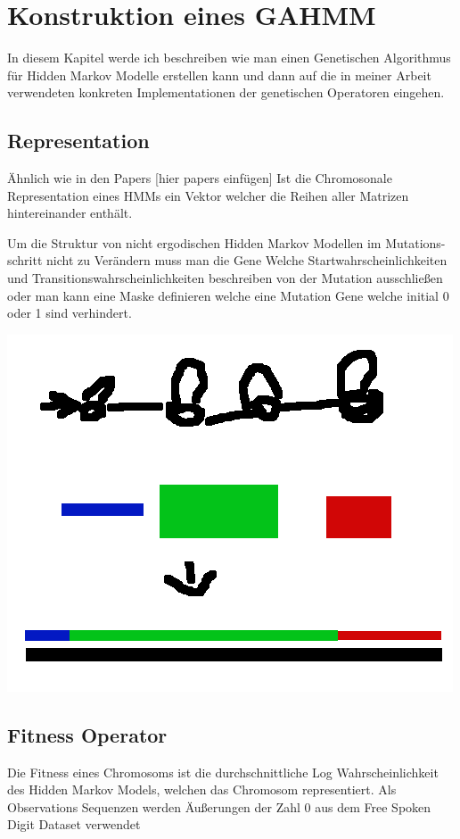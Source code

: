 \section{Konstruktion eines GAHMM}

In diesem Kapitel werde ich beschreiben wie man einen Genetischen Algorithmus 
für Hidden Markov Modelle erstellen kann und dann auf die in meiner Arbeit verwendeten 
konkreten Implementationen der genetischen Operatoren eingehen.



\subsection*{Representation}
Ähnlich wie in den Papers [hier papers einfügen] 
Ist die Chromosonale Representation eines HMMs ein Vektor welcher 
die Reihen aller Matrizen hintereinander enthält.

Um die Struktur von nicht ergodischen Hidden Markov Modellen im Mutations-schritt nicht zu Verändern 
muss man die Gene Welche Startwahrscheinlichkeiten und Transitionswahrscheinlichkeiten
beschreiben von der Mutation ausschließen oder man kann eine Maske definieren
welche eine Mutation Gene welche initial 0 oder 1 sind verhindert.


\includegraphics[scale=1.0]{images/Hmm_Chromosom_Representation.png}


\subsection*{Fitness Operator}
Die Fitness eines Chromosoms ist die durchschnittliche Log Wahrscheinlichkeit 
des Hidden Markov Models, welchen das Chromosom representiert.
Als Observations Sequenzen werden Äußerungen der Zahl 0 aus dem Free Spoken Digit Dataset verwendet

